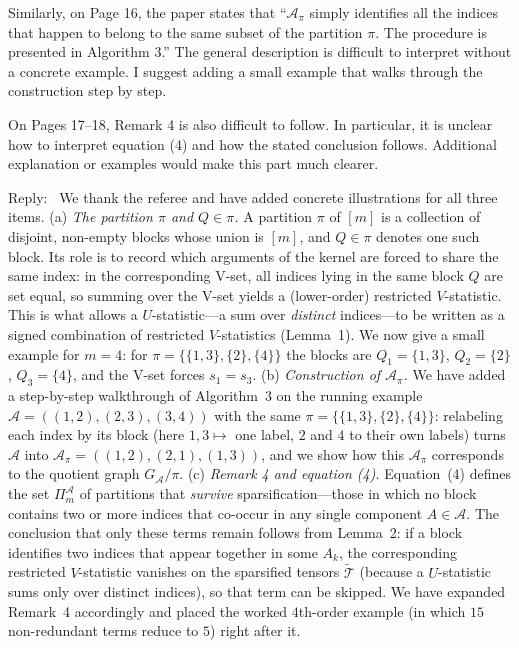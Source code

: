 \documentclass[12pt]{article}
\newenvironment{reply}{\par\smallskip\noindent\color{blue}Reply:\ \ignorespaces}{\par}
\newcommand{\calA}{\mathcal{A}}
\newcommand{\calT}{\mathcal{T}}
\begin{document}
\begin{enumerate}
Similarly, on Page 16, the paper states that ``$\mathcal{A}_\pi$ simply identifies all the indices that happen to belong to the same subset of the partition $\pi$. The procedure is presented in Algorithm 3.'' The general description is difficult to interpret without a concrete example. I suggest adding a small example that walks through the construction step by step.

On Pages 17--18, Remark 4 is also difficult to follow. In particular, it is unclear how to interpret equation (4) and how the stated conclusion follows. Additional explanation or examples would make this part much clearer.

\begin{reply}
We thank the referee and have added concrete illustrations for all three items. (a) \emph{The partition $\pi$ and $Q\in\pi$.} A partition $\pi$ of $[m]$ is a collection of disjoint, non-empty blocks whose union is $[m]$, and $Q\in\pi$ denotes one such block. Its role is to record which arguments of the kernel are forced to share the same index: in the corresponding V-set, all indices lying in the same block $Q$ are set equal, so summing over the V-set yields a (lower-order) restricted $V$-statistic. This is what allows a $U$-statistic---a sum over \emph{distinct} indices---to be written as a signed combination of restricted $V$-statistics (Lemma~1). We now give a small example for $m=4$: for $\pi=\{\{1,3\},\{2\},\{4\}\}$ the blocks are $Q_1=\{1,3\}$, $Q_2=\{2\}$, $Q_3=\{4\}$, and the V-set forces $s_1=s_3$. (b) \emph{Construction of $\calA_\pi$.} We have added a step-by-step walkthrough of Algorithm~3 on the running example $\calA=((1,2),(2,3),(3,4))$ with the same $\pi=\{\{1,3\},\{2\},\{4\}\}$: relabeling each index by its block (here $1,3\mapsto$ one label, $2$ and $4$ to their own labels) turns $\calA$ into $\calA_\pi=((1,2),(2,1),(1,3))$, and we show how this $\calA_\pi$ corresponds to the quotient graph $G_{\calA}/\pi$. (c) \emph{Remark 4 and equation (4).} Equation~(4) defines the set $\Pi_m^{\calA}$ of partitions that \emph{survive} sparsification---those in which no block contains two or more indices that co-occur in any single component $A\in\calA$. The conclusion that only these terms remain follows from Lemma~2: if a block identifies two indices that appear together in some $A_k$, the corresponding restricted $V$-statistic vanishes on the sparsified tensors $\widetilde{\calT}$ (because a $U$-statistic sums only over distinct indices), so that term can be skipped. We have expanded Remark~4 accordingly and placed the worked $4$th-order example (in which $15$ non-redundant terms reduce to $5$) right after it.
\end{reply}


\end{enumerate}
\end{document}
